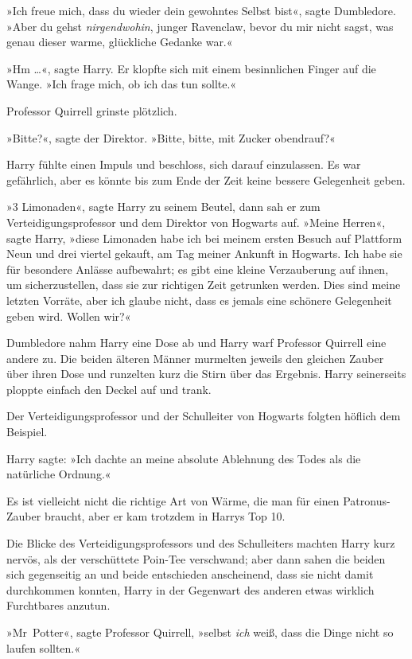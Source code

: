 {»Ich freue mich, dass du wieder dein gewohntes Selbst bist«, sagte Dumbledore. »Aber du gehst \emph{nirgendwohin}, junger Ravenclaw, bevor du mir nicht sagst, was genau dieser warme, glückliche Gedanke war.«

»Hm …«, sagte Harry. Er klopfte sich mit einem besinnlichen Finger auf die Wange. »Ich frage mich, ob ich das tun sollte.«

Professor Quirrell grinste plötzlich.

»Bitte?«, sagte der Direktor. »Bitte, bitte, mit Zucker obendrauf?«

Harry fühlte einen Impuls und beschloss, sich darauf einzulassen. Es war gefährlich, aber es könnte bis zum Ende der Zeit keine bessere Gelegenheit geben.

»3 Limonaden«, sagte Harry zu seinem Beutel, dann sah er zum Verteidigungsprofessor und dem Direktor von Hogwarts auf. »Meine Herren«, sagte Harry, »diese Limonaden habe ich bei meinem ersten Besuch auf Plattform Neun und drei viertel gekauft, am Tag meiner Ankunft in Hogwarts. Ich habe sie für besondere Anlässe aufbewahrt; es gibt eine kleine Verzauberung auf ihnen, um sicherzustellen, dass sie zur richtigen Zeit getrunken werden. Dies sind meine letzten Vorräte, aber ich glaube nicht, dass es jemals eine schönere Gelegenheit geben wird. Wollen wir?«

Dumbledore nahm Harry eine Dose ab und Harry warf Professor Quirrell eine andere zu. Die beiden älteren Männer murmelten jeweils den gleichen Zauber über ihren Dose und runzelten kurz die Stirn über das Ergebnis. Harry seinerseits ploppte einfach den Deckel auf und trank.

Der Verteidigungsprofessor und der Schulleiter von Hogwarts folgten höflich dem Beispiel.

Harry sagte: »Ich dachte an meine absolute Ablehnung des Todes als die natürliche Ordnung.«

Es ist vielleicht nicht die richtige Art von Wärme, die man für einen Patronus-Zauber braucht, aber er kam trotzdem in Harrys Top 10.

Die Blicke des Verteidigungsprofessors und des Schulleiters machten Harry kurz nervös, als der verschüttete Poin-Tee verschwand; aber dann sahen die beiden sich gegenseitig an und beide entschieden anscheinend, dass sie nicht damit durchkommen konnten, Harry in der Gegenwart des anderen etwas wirklich Furchtbares anzutun.

»Mr~Potter«, sagte Professor Quirrell, »selbst \emph{ich} weiß, dass die Dinge nicht so laufen sollten.«

}

